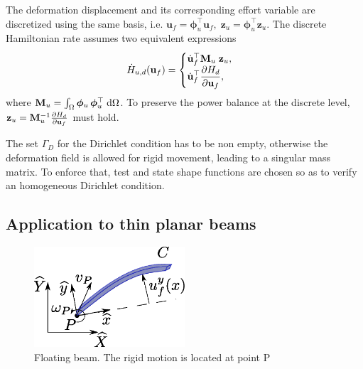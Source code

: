 \documentclass{svjour3}                     %
\begin{document}
	The deformation displacement and its corresponding effort variable are discretized using the same basis, i.e. $\bm{u}_f = \bm{\phi}_u^\top \mathbf{u}_f, \; \bm{z}_u = \bm{\phi}_u^\top \mathbf{z}_u$. The discrete Hamiltonian rate assumes two equivalent expressions
	\begin{equation*}
	\dot{H}_{u, d}(\mathbf{u}_f) = 
	\begin{cases}
	\dot{\mathbf{u}}_f^\top \mathbf{M}_u \; \mathbf{z}_u, \\
	\displaystyle \dot{\mathbf{u}}_f^\top \diffp{H_d}{\mathbf{u}_f},
	\end{cases}
	\end{equation*}
	where $\mathbf{M}_u=\int_{\Omega} \bm{\phi}_u \, \bm{\phi}_u^\top \d{\Omega}$. To preserve the power balance at the discrete level, $ \mathbf{z}_u = \mathbf{M}_u^{-1} \diffp{H_d}{\mathbf{u}_f}$ must hold. \\
	
	\begin{remark}\label{rmk:dirich}
		The set $\Gamma_D$ for the Dirichlet condition has to be non empty, otherwise the deformation field is allowed for rigid movement, leading to a singular mass matrix. To enforce that, test and state shape functions are chosen so as to verify an homogeneous Dirichlet condition. 
	\end{remark}
	
	\subsection{Application to thin planar beams}
	\label{sec:ph_floatbeam}
	
	\begin{figure}[t]
		\centering
		\includegraphics[width=0.5\textwidth]{beam.eps} 
		\caption{Floating beam. The rigid motion is located at point P}
		\label{fig:beam}
	\end{figure}
	
\end{document}
